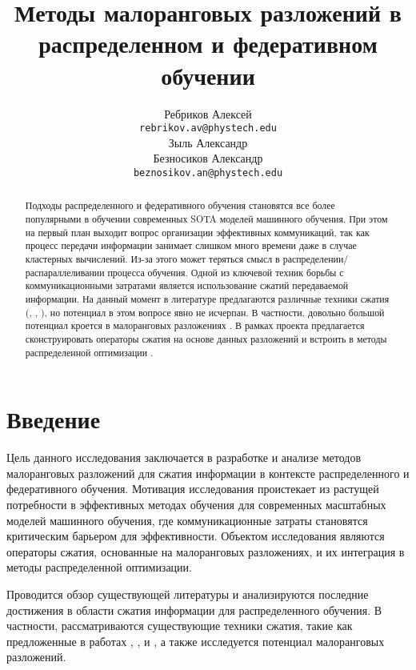 \documentclass{article}
\title{Методы малоранговых разложений в распределенном и федеративном обучении}
\author{ Ребриков Алексей \\
	\texttt{rebrikov.av@phystech.edu} \\
	\And
	Зыль Александр\\
	\And 
	Безносиков Александр\\
	\texttt{beznosikov.an@phystech.edu} \\
}
\date{}
\begin{document}
\maketitle

\begin{abstract}
	Подходы распределенного и федеративного обучения становятся все более популярными в обучении современных SOTA моделей машинного обучения. При этом на первый план выходит вопрос организации эффективных коммуникаций, так как процесс передачи информации занимает слишком много времени даже в случае кластерных вычислений. Из-за этого может теряться смысл в распределении/распараллеливании процесса обучения. Одной из ключевой техник  борьбы с коммуникационными затратами является использование сжатий передаваемой информации. На данный момент в литературе предлагаются различные техники сжатия (\citep{beznosikov2023biased}, \citep{alistarh2017qsgd}, \citep{horvoth2022natural}), но потенциал в этом вопросе явно не исчерпан. В частности, довольно большой потенциал кроется в малоранговых разложениях \citep{Gundersen2019RSVD}. В рамках проекта предлагается сконструировать операторы сжатия на основе данных разложений и встроить в методы распределенной оптимизации \citep{richtarik2021ef21}.
\end{abstract}



\section{Введение}

Цель данного исследования заключается в разработке и анализе методов малоранговых разложений для сжатия информации в контексте распределенного и федеративного обучения. Мотивация исследования проистекает из растущей потребности в эффективных методах обучения для современных масштабных моделей машинного обучения, где коммуникационные затраты становятся критическим барьером для эффективности. Объектом исследования являются операторы сжатия, основанные на малоранговых разложениях, и их интеграция в методы распределенной оптимизации. 

Проводится обзор существующей литературы и анализируются последние достижения в области сжатия информации для распределенного обучения. В частности, рассматриваются существующие техники сжатия, такие как предложенные в работах \citep{beznosikov2023biased}, \citep{alistarh2017qsgd}, и \citep{horvoth2022natural}, а также исследуется потенциал малоранговых разложений.
\end{document}
